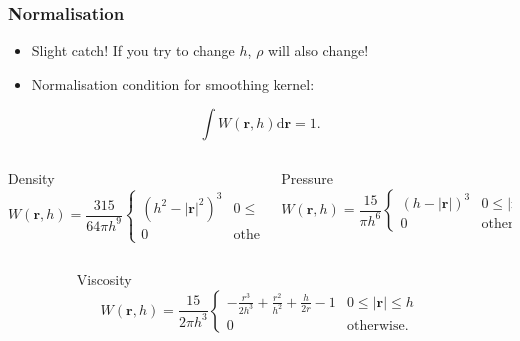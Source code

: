\documentclass[aspectratio=169]{beamer}
\begin{document}
\begin{frame}
\frametitle{Normalisation}
\begin{itemize}
\item Slight catch! If you try to change \(h\), \(\rho\) will also change!
\pause
\item Normalisation condition for smoothing kernel:
\end{itemize}
\[
\int W\left(\mathbf{r}, h\right) \text{d}\mathbf{r} = 1.
\]
\pause
\begin{columns}
\begin{column}{0.45\textwidth}
\begin{block}{Density}
\vspace{-1em}
{\small\[
W\left(\mathbf{r}, h\right) = \frac{315}{64\pi h^9}
\begin{cases} 
    \left(h^2-\left|\mathbf{r}\right|^2\right)^3 & 0 \leq \left|\mathbf{r}\right| \leq h \\ 
    0 & \text{otherwise.}
\end{cases}
\]}
\end{block}
\end{column}


\begin{column}{0.45\textwidth}
\begin{block}{Pressure}
\vspace{-1em}
{\small\[
W\left(\mathbf{r}, h\right) = \frac{15}{\pi h^6}
\begin{cases} 
    \left(h-\left|\mathbf{r}\right|\right)^3 & 0 \leq \left|\mathbf{r}\right| \leq h \\ 
    0 & \text{otherwise.}
\end{cases}
\]}
\end{block}
\end{column}
\end{columns}


\begin{columns}
\begin{column}{0.18\textwidth}
\end{column}
\begin{column}{0.54\textwidth}
\begin{block}{Viscosity}
\vspace{-1em}
{\small\[
W\left(\mathbf{r}, h\right) = \frac{15}{2\pi h^3}
\begin{cases} 
    -\frac{r^3}{2h^3}+\frac{r^2}{h^2}+\frac{h}{2r}-1 & 0 \leq \left|\mathbf{r}\right| \leq h \\ 
    0 & \text{otherwise.}
\end{cases}
\]}
\end{block}
\end{column}
\begin{column}{0.18\textwidth}
\end{column}
\end{columns}
\end{frame}
\end{document}
